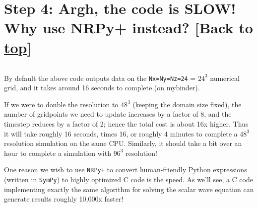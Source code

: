 \documentclass[landscape,letterpaper,10pt,english]{article}
\begin{document}
    \hypertarget{step-4-argh-the-code-is-slow-why-use-nrpy-instead-back-to-top}{%
\section{\texorpdfstring{Step 4: Argh, the code is SLOW! Why use NRPy+
instead? {[}Back to
\hyperref[toc]{top}{]}}{Step 4: Argh, the code is SLOW! Why use NRPy+ instead? {[}Back to {]}}}\label{step-4-argh-the-code-is-slow-why-use-nrpy-instead-back-to-top}}

\[\label{too_slow}\]

By default the above code outputs data on the \texttt{Nx=Ny=Nz=24} =
\(24^3\) numerical grid, and it takes around 16 seconds to complete (on
mybinder).

If we were to double the resolution to \(48^3\) (keeping the domain size
fixed), the number of gridpoints we need to update increases by a factor
of 8, and the timestep reduces by a factor of 2; hence the total cost is
about 16x higher. Thus it will take roughly 16 seconds, times 16, or
roughly 4 minutes to complete a \(48^3\) resolution simulation on the
same CPU. Similarly, it should take a bit over an hour to complete a
simulation with \(96^3\) resolution!

One reason we wish to use \texttt{NRPy+} to convert human-friendly
Python expressions (written in \texttt{SymPy}) to highly optimized C
code is the speed. As we'll see, a C code implementing exactly the same
algorithm for solving the scalar wave equation can generate results
roughly 10,000x faster!
\end{document}
